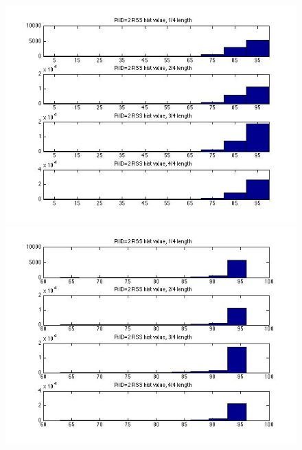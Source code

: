 \documentclass[10pt,conference]{IEEEtran}
\begin{document}
\begin{figure}[htbp]
\centering
\begin{minipage}[t]{0.2\textwidth}
	\centering
	\includegraphics[scale=0.2]{time1-5}
\end{minipage}
\begin{minipage}[t]{0.2\textwidth}
	\centering
	\includegraphics[scale=0.2]{time1-6}
\end{minipage}
\begin{minipage}[t]{0.2\textwidth}
	\centering

\end{minipage}
\end{figure}
\end{document}
